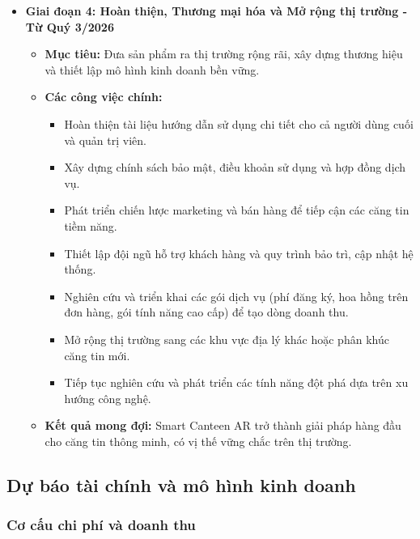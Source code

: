 \documentclass[12pt,a4paper]{article}
\begin{document}
\begin{itemize}[label=\textbullet]
    \item \textbf{Giai đoạn 4: Hoàn thiện, Thương mại hóa và Mở rộng thị trường - Từ Quý 3/2026}
    \begin{itemize}[label=\textbullet]
        \item \textbf{Mục tiêu:} Đưa sản phẩm ra thị trường rộng rãi, xây dựng thương hiệu và thiết lập mô hình kinh doanh bền vững.
        \item \textbf{Các công việc chính:}
        \begin{itemize}[label=\textrightarrow]
            \item Hoàn thiện tài liệu hướng dẫn sử dụng chi tiết cho cả người dùng cuối và quản trị viên.
            \item Xây dựng chính sách bảo mật, điều khoản sử dụng và hợp đồng dịch vụ.
            \item Phát triển chiến lược marketing và bán hàng để tiếp cận các căng tin tiềm năng.
            \item Thiết lập đội ngũ hỗ trợ khách hàng và quy trình bảo trì, cập nhật hệ thống.
            \item Nghiên cứu và triển khai các gói dịch vụ (phí đăng ký, hoa hồng trên đơn hàng, gói tính năng cao cấp) để tạo dòng doanh thu.
            \item Mở rộng thị trường sang các khu vực địa lý khác hoặc phân khúc căng tin mới.
            \item Tiếp tục nghiên cứu và phát triển các tính năng đột phá dựa trên xu hướng công nghệ.
        \end{itemize}
        \item \textbf{Kết quả mong đợi:} Smart Canteen AR trở thành giải pháp hàng đầu cho căng tin thông minh, có vị thế vững chắc trên thị trường.
    \end{itemize}
\end{itemize}

\subsection{Dự báo tài chính và mô hình kinh doanh}

\subsubsection{Cơ cấu chi phí và doanh thu}
\end{document}
